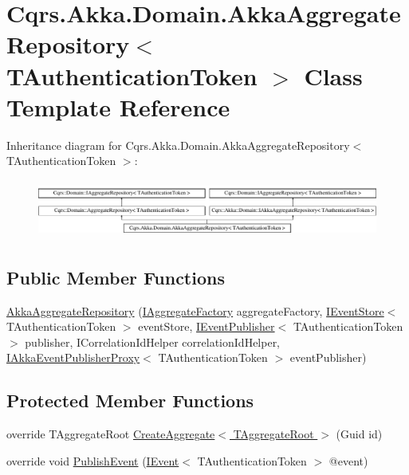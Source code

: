 \hypertarget{classCqrs_1_1Akka_1_1Domain_1_1AkkaAggregateRepository}{}\section{Cqrs.\+Akka.\+Domain.\+Akka\+Aggregate\+Repository$<$ T\+Authentication\+Token $>$ Class Template Reference}
\label{classCqrs_1_1Akka_1_1Domain_1_1AkkaAggregateRepository}
Inheritance diagram for Cqrs.\+Akka.\+Domain.\+Akka\+Aggregate\+Repository$<$ T\+Authentication\+Token $>$\+:\begin{figure}[H]
\begin{center}
\leavevmode
\includegraphics[height=1.958042cm]{classCqrs_1_1Akka_1_1Domain_1_1AkkaAggregateRepository}
\end{center}
\end{figure}
\subsection*{Public Member Functions}
\begin{DoxyCompactItemize}
\item 
\hyperlink{classCqrs_1_1Akka_1_1Domain_1_1AkkaAggregateRepository_afc997ba5187ca08d3f81a0c204eda3a2_afc997ba5187ca08d3f81a0c204eda3a2}{Akka\+Aggregate\+Repository} (\hyperlink{interfaceCqrs_1_1Domain_1_1Factories_1_1IAggregateFactory}{I\+Aggregate\+Factory} aggregate\+Factory, \hyperlink{interfaceCqrs_1_1Events_1_1IEventStore}{I\+Event\+Store}$<$ T\+Authentication\+Token $>$ event\+Store, \hyperlink{interfaceCqrs_1_1Events_1_1IEventPublisher}{I\+Event\+Publisher}$<$ T\+Authentication\+Token $>$ publisher, I\+Correlation\+Id\+Helper correlation\+Id\+Helper, \hyperlink{interfaceCqrs_1_1Akka_1_1Events_1_1IAkkaEventPublisherProxy}{I\+Akka\+Event\+Publisher\+Proxy}$<$ T\+Authentication\+Token $>$ event\+Publisher)
\end{DoxyCompactItemize}
\subsection*{Protected Member Functions}
\begin{DoxyCompactItemize}
\item 
override T\+Aggregate\+Root \hyperlink{classCqrs_1_1Akka_1_1Domain_1_1AkkaAggregateRepository_a889a80595755372614382c36092f30dc_a889a80595755372614382c36092f30dc}{Create\+Aggregate$<$ T\+Aggregate\+Root $>$} (Guid id)
\item 
override void \hyperlink{classCqrs_1_1Akka_1_1Domain_1_1AkkaAggregateRepository_a144cbfdedb23039729ba5b3058f84e7a_a144cbfdedb23039729ba5b3058f84e7a}{Publish\+Event} (\hyperlink{interfaceCqrs_1_1Events_1_1IEvent}{I\+Event}$<$ T\+Authentication\+Token $>$ @event)
\end{DoxyCompactItemize}
